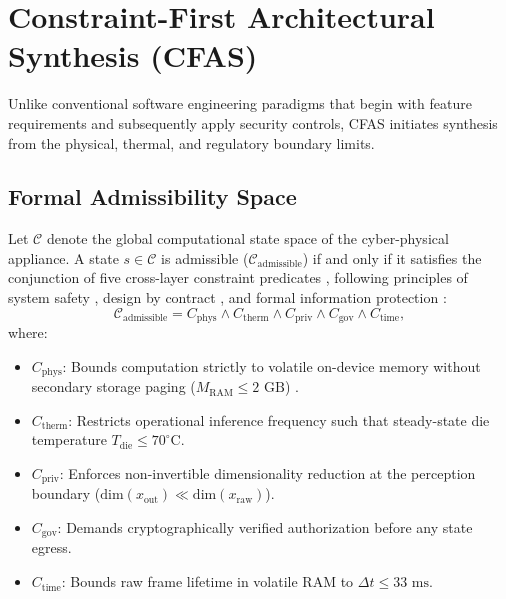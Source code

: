 \documentclass[conference]{IEEEtran}
\begin{document}
\section{Constraint-First Architectural Synthesis (CFAS)}

Unlike conventional software engineering paradigms that begin with feature requirements and subsequently apply security controls, CFAS initiates synthesis from the physical, thermal, and regulatory boundary limits.

\subsection{Formal Admissibility Space}
Let $\mathcal{C}$ denote the global computational state space of the cyber-physical appliance. A state $s \in \mathcal{C}$ is admissible ($\mathcal{C}_{\mathrm{admissible}}$) if and only if it satisfies the conjunction of five cross-layer constraint predicates \cite{b_hoare}, following principles of system safety \cite{b_leveson}, design by contract \cite{b_meyer}, and formal information protection \cite{b_saltzer}:
\begin{equation}
\mathcal{C}_{\mathrm{admissible}} = C_{\mathrm{phys}} \land C_{\mathrm{therm}} \land C_{\mathrm{priv}} \land C_{\mathrm{gov}} \land C_{\mathrm{time}},
\label{eq:cfas_admissibility}
\end{equation}
where:
\begin{itemize}
    \item $C_{\mathrm{phys}}$: Bounds computation strictly to volatile on-device memory without secondary storage paging ($M_{\mathrm{RAM}} \le 2\text{ GB}$) \cite{P5}.
    \item $C_{\mathrm{therm}}$: Restricts operational inference frequency such that steady-state die temperature $T_{\mathrm{die}} \le 70^\circ\text{C}$.
    \item $C_{\mathrm{priv}}$: Enforces non-invertible dimensionality reduction at the perception boundary ($\text{dim}(x_{\mathrm{out}}) \ll \text{dim}(x_{\mathrm{raw}})$).
    \item $C_{\mathrm{gov}}$: Demands cryptographically verified authorization before any state egress.
    \item $C_{\mathrm{time}}$: Bounds raw frame lifetime in volatile RAM to $\Delta t \le 33\text{ ms}$.
\end{itemize}
\end{document}
